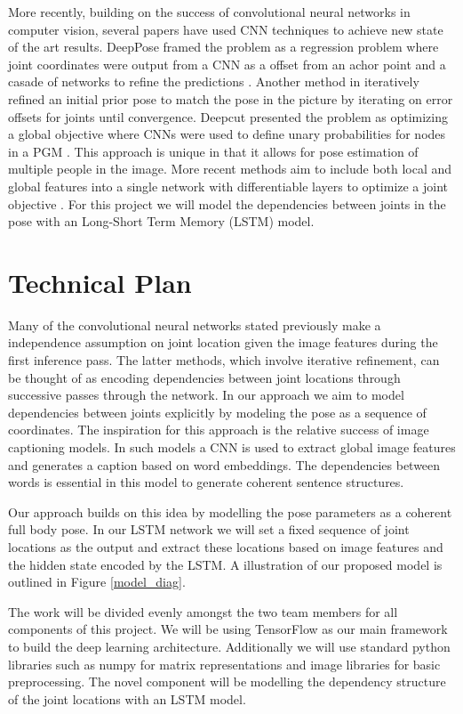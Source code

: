 \documentclass[12pt]{article}
\begin{document}
More recently, building on the success of convolutional neural networks in computer vision, several papers have used CNN techniques to achieve new state of the art results. DeepPose framed the problem as a regression problem where joint coordinates were output from a CNN as a offset from an achor point and a casade of networks to refine the predictions \cite{toshev2014deeppose}. Another method in \cite{carreira2015human} iteratively refined an initial prior pose to match the pose in the picture by iterating on error offsets for joints until convergence. Deepcut presented the problem as optimizing a global objective where CNNs were used to define unary probabilities for nodes in a PGM \cite{pishchulin2015deepcut}. This approach is unique in that it allows for pose estimation of multiple people in the image. More recent methods aim to include both local and global features into a single network with differentiable layers to optimize a joint objective \cite{wei2016convolutional} \cite{newell2016stacked}. For this project we will model the dependencies between joints in the pose with an Long-Short Term Memory (LSTM) model.

\section{Technical Plan}

Many of the convolutional neural networks stated previously make a independence assumption on joint location given the image features during the first inference pass. The latter methods, which involve iterative refinement, can be thought of as encoding dependencies between joint locations through successive passes through the network. In our approach we aim to model dependencies between joints explicitly by modeling the pose as a sequence of coordinates. The inspiration for this approach is the relative success of image captioning models. In such models a CNN is used to extract global image features and generates a caption based on word embeddings. The dependencies between words is essential in this model to generate coherent sentence structures.

Our approach builds on this idea by modelling the pose parameters as a coherent full body pose. In our LSTM network we will set a fixed sequence of joint locations as the output and extract these locations based on image features and the hidden state encoded by the LSTM. A illustration of our proposed model is outlined in Figure \ref{model_diag}.

The work will be divided evenly amongst the two team members for all components of this project. We will be using TensorFlow as our main framework to build the deep learning architecture. Additionally we will use standard python libraries such as numpy for matrix representations and image libraries for basic preprocessing. The novel component will be modelling the dependency structure of the joint locations with an LSTM model.
\end{document}
